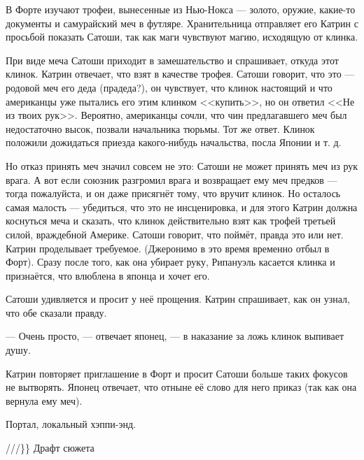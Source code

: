 В Форте изучают трофеи, вынесенные из Нью-Нокса --- золото, оружие, какие-то документы и самурайский меч в футляре.
Хранительница отправляет его Катрин с просьбой показать Сатоши, так как маги чувствуют магию, исходящую от клинка.


При виде меча Сатоши приходит в замешательство и спрашивает, откуда этот клинок. Катрин отвечает, что взят в качестве трофея.
Сатоши говорит, что это --- родовой меч его деда (прадеда?), он чувствует,
что клинок настоящий и что американцы уже пытались его этим клинком <<купить>>, но он ответил <<Не из твоих рук>>.
Вероятно, американцы сочли, что чин предлагавшего меч был недостаточно высок, позвали начальника тюрьмы. Тот же ответ.
Клинок положили дожидаться приезда какого-нибудь начальства, посла Японии и т. д.

Но отказ принять меч значил совсем не это: Сатоши не может принять меч из рук врага.
А вот если союзник разгромил врага и возвращает ему меч предков --- тогда пожалуйста,
и он даже присягнёт тому, что вручит клинок. Но осталось самая малость ---
убедиться, что это не инсценировка, и для этого Катрин должна коснуться меча и сказать,
что клинок действительно взят как трофей третьей силой, враждебной Америке.
Сатоши говорит, что поймёт, правда это или нет. Катрин проделывает требуемое.
(Джеронимо в это время временно отбыл в Форт).
Сразу после того, как она убирает руку, Рипануэль касается клинка и признаётся, что влюблена в японца и хочет его.

Сатоши удивляется и просит у неё прощения. Катрин спрашивает, как он узнал, что обе сказали правду.

--- Очень просто, --- отвечает японец, --- в наказание за ложь клинок выпивает душу.

Катрин повторяет приглашение в Форт и просит Сатоши больше таких фокусов не вытворять.
Японец отвечает, что отныне её слово для него приказ (так как она вернула ему меч).


Портал, локальный хэппи-энд.


///\}\} Драфт сюжета

